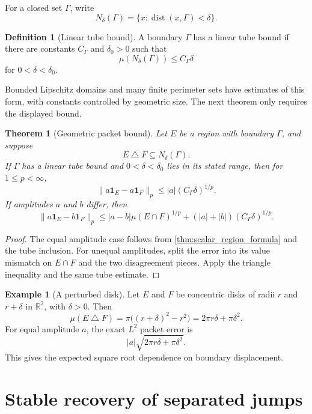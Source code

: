 \documentclass[11pt,letterpaper]{article}
\newtheorem{theorem}{Theorem}[section]
\theoremstyle{plain}
\theoremstyle{plain}
\theoremstyle{plain}
\theoremstyle{definition}
\newtheorem{definition}[definition]{Definition}
\theoremstyle{definition}
\newtheorem{example}[example]{Example}
\theoremstyle{definition}
\theoremstyle{definition}
\theoremstyle{remark}
\theoremstyle{remark}
\theoremstyle{remark}
\theoremstyle{remark}
\newcommand{\RR}{\mathbb R}
\newcommand{\dist}{\operatorname{dist}}
\newcommand{\one}{\mathbf 1}
\let\KomorebiPrimitiveMathbin\mathbin
\renewcommand{\mathbin}[1]{\KomorebiPrimitiveMathbin{#1}}
\begin{document}
For a closed set \(\Gamma\), write
\[
N_\delta(\Gamma)
=
\{x:\dist(x,\Gamma)<\delta\}.
\]

\begin{definition}[Linear tube bound]\label{def:linear_tube_bound}
A boundary \(\Gamma\) has a linear tube bound if there are constants \(C_\Gamma\) and \(\delta_0>0\) such that
\[
\mu(N_\delta(\Gamma))
\leq
C_\Gamma\delta
\]
for \(0<\delta<\delta_0\).
\end{definition}

Bounded Lipschitz domains and many finite perimeter sets have estimates of this form, with constants controlled by geometric size. The next theorem only requires the displayed bound.

\begin{theorem}[Geometric packet bound]\label{thm:geometric_packet_bound}
Let \(E\) be a region with boundary \(\Gamma\), and suppose
\[
E\mathbin\triangle F
\subseteq
N_\delta(\Gamma).
\]
If \(\Gamma\) has a linear tube bound and \(0<\delta<\delta_0\) lies in its stated range, then for \(1\leq p<\infty\),
\[
\|a\one_E-a\one_F\|_p
\leq
|a|(C_\Gamma\delta)^{1/p}.
\]
If amplitudes \(a\) and \(b\) differ, then
\[
\|a\one_E-b\one_F\|_p
\leq
|a-b|\mu(E\cap F)^{1/p}
+
(|a|+|b|)(C_\Gamma\delta)^{1/p}.
\]
\end{theorem}

\begin{proof}
The equal amplitude case follows from \cref{thm:scalar_region_formula} and the tube inclusion. For unequal amplitudes, split the error into its value mismatch on \(E\cap F\) and the two disagreement pieces. Apply the triangle inequality and the same tube estimate.
\end{proof}

\begin{example}[A perturbed disk]\label{ex:perturbed_disk}
Let \(E\) and \(F\) be concentric disks of radii \(r\) and \(r+\delta\) in \(\RR^2\), with \(\delta>0\). Then
\[
\mu(E\mathbin\triangle F)
=
\pi\bigl((r+\delta)^2-r^2\bigr)
=
2\pi r\delta+\pi\delta^2.
\]
For equal amplitude \(a\), the exact \(L^2\) packet error is
\[
|a|\sqrt{2\pi r\delta+\pi\delta^2}.
\]
This gives the expected square root dependence on boundary displacement.
\end{example}

\section{Stable recovery of separated jumps}\label{extension:section:09}\label{sec:jump_recovery}
\end{document}
